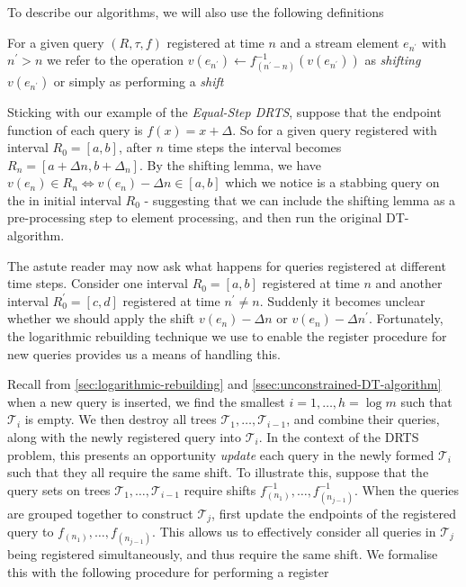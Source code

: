 To describe our algorithms, we will also use the following definitions

\begin{definition}
    For a given query $(R, \tau, f)$ registered at time $n$ and a stream element $e_{n^\prime}$ with $n^\prime > n$ we refer to the operation $v(e_{n^\prime})\gets f^{-1}_{(n^\prime - n)}(v(e_{n^\prime}))$ as \textit{shifting $v(e_{n^\prime})$} or simply as performing a \textit{shift}
\end{definition}

Sticking with our example of the \textit{Equal-Step DRTS}, suppose that the endpoint function of each query is $f(x) = x+\Delta$. So for a given query registered with interval $R_0 = [a,b]$, after $n$ time steps the interval becomes $R_n = [a + \Delta n, b+\Delta_n]$. By the shifting lemma, we have $v(e_n) \in R_n \iff v(e_n) - \Delta n \in [a,b]$ which we notice is a stabbing query on the in initial interval $R_0$ - suggesting that we can include the shifting lemma as a pre-processing step to element processing, and then run the original DT-algorithm.

The astute reader may now ask what happens for queries registered at different time steps. Consider one interval $R_0 = [a, b]$ registered at time $n$ and another interval $R^\prime_0 = [c,d]$ registered at time $n^\prime \neq n$. Suddenly it becomes unclear whether we should apply the shift $v(e_n) - \Delta n$ or $v(e_n) - \Delta n^\prime$. Fortunately, the logarithmic rebuilding technique we use to enable the register procedure for new queries provides us a means of handling this.

Recall from \cref{sec:logarithmic-rebuilding} and \cref{ssec:unconstrained-DT-algorithm} when a new query is inserted, we find the smallest $i = 1,\dots,h=\log m$ such that $\mathcal{T}_i$ is empty. We then destroy all trees $\mathcal{T}_1,\dots,\mathcal{T}_{i-1}$, and combine their queries, along with the newly registered query into $\mathcal{T}_i$. In the context of the DRTS problem, this presents an opportunity \textit{update} each query in the newly formed $\mathcal{T}_i$ such that they all require the same shift. To illustrate this, suppose that the query sets on trees $\mathcal{T}_1,\dots,\mathcal{T}_{i-1}$ require shifts $f^{-1}_{(n_1)},\dots,f^{-1}_{(n_{j-1})}$. When the queries are grouped together to construct $\mathcal{T}_{j}$, first update the endpoints of the registered query to $f_{(n_1)}, \dots, f_{(n_{j-1})}$. This allows us to effectively consider all queries in $\mathcal{T}_j$ being registered simultaneously, and thus require the same shift. We formalise this with the following procedure for performing a register

